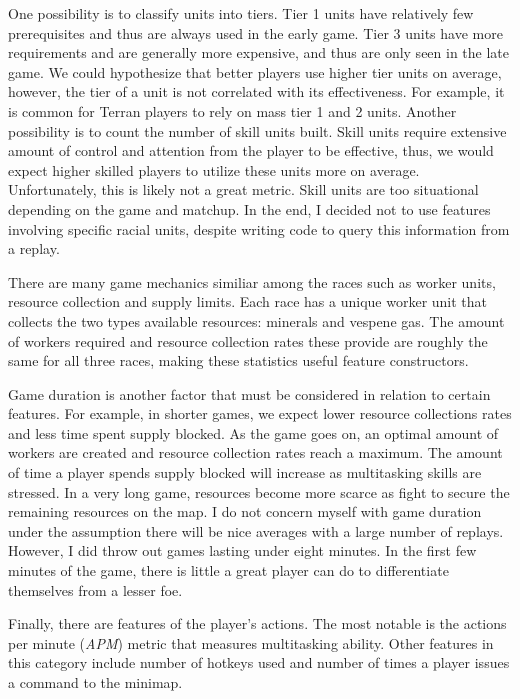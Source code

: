 \documentclass{article} %
\begin{document}
One possibility is to classify units into tiers. Tier 1 units have relatively few prerequisites and thus are always used in the early game. Tier 3 units have more requirements and are generally more expensive, and thus are only seen in the late game. We could hypothesize that better players use higher tier units on average, however, the tier of a unit is not correlated with its effectiveness. For example, it is common for Terran players to rely on mass tier 1 and 2 units.  Another possibility is to count the number of skill units built. Skill units require extensive amount of control and attention from the player to be effective, thus, we would expect higher skilled players to utilize these units more on average. Unfortunately, this is likely not a great metric. Skill units are too situational depending on the game and matchup. In the end, I decided not to use features involving specific racial units, despite writing code to query this information from a replay. 

There are many game mechanics similiar among the races such as worker units, resource collection and supply limits. Each race has a unique worker unit that collects the two types available resources: minerals and vespene gas. The amount of workers required and resource collection rates these provide are roughly the same for all three races, making these statistics useful feature constructors. 

Game duration is another factor that must be considered in relation to certain features. For example, in shorter games, we expect lower resource collections rates and less time spent supply blocked. As the game goes on, an optimal amount of workers are created and resource collection rates reach a maximum. The amount of time a player spends supply blocked will increase as multitasking skills are stressed. In a very long game, resources become more scarce as fight to secure the remaining resources on the map. I do not concern myself with game duration under the assumption there will be nice averages with a large number of replays. However, I did throw out games lasting under eight minutes. In the first few minutes of the game, there is little a great player can do to differentiate themselves from a lesser foe.

Finally, there are features of the player's actions. The most notable is the actions per minute (\emph{APM}) metric that measures multitasking ability. Other features in this category include number of hotkeys used and number of times  a player issues a command to the minimap.
\end{document}
